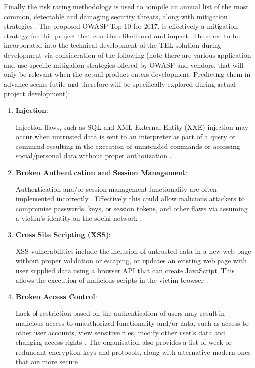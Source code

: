 Finally the risk rating methodology is used to compile an annual list of the most common, detectable and damaging security threats, along with mitigation strategies \cite{OWASP2017}. The proposed OWASP Top 10 for 2017, is effectively a mitigation strategy for this project that considers likelihood and impact. These are to be incorporated into the technical development of the TEL solution during development via consideration of the following (note there are various application and use specific mitigation strategies offered by OWASP and vendors, that will only be relevant when the actual product enters development. Predicting them in advance seems futile and therefore will be specifically explored during actual project development):

\begin{enumerate}
    \item \textbf{Injection}:
    
    Injection flaws, such as SQL and XML External Entity (XXE) injection may occur when untrusted data is sent to an interpreter as part of a query or command resulting in the execution of  unintended commands or accessing social/personal data without proper authorization \cite{OWASP2017}.

    \item \textbf{Broken Authentication and Session Management}:
    
    Authentication and/or session management functionality are often implemented incorrectly \cite{OWASP2017}. Effectively this could allow malicious attackers to compromise passwords, keys, or session tokens, and other flaws via assuming a victim's identity on the social network \cite{OWASP2017}.
    

    \item \textbf{Cross Site Scripting (XSS)}:
    
    XSS vulnerabilities include the inclusion of untrusted data in a new web page without proper validation or escaping, or updates an existing web page with user supplied data using a browser API that can create JavaScript. This allows the execution of malicious scripts in the victim browser \cite{OWASP2017}.
    
    \newpage
    
    \item \textbf{Broken Access Control}:
    
    Lack of restriction based on the authentication of users may result in  malicious access to unauthorized functionality and/or data, such as access to other user accounts, view sensitive files, modify other user's data and  changing access rights \cite{OWASP2017}. The organisation also provides a list of weak or redundant encryption keys and protocols, along with alternative modern ones that are more secure \cite{OWASP2017}.
    

\end{enumerate}
